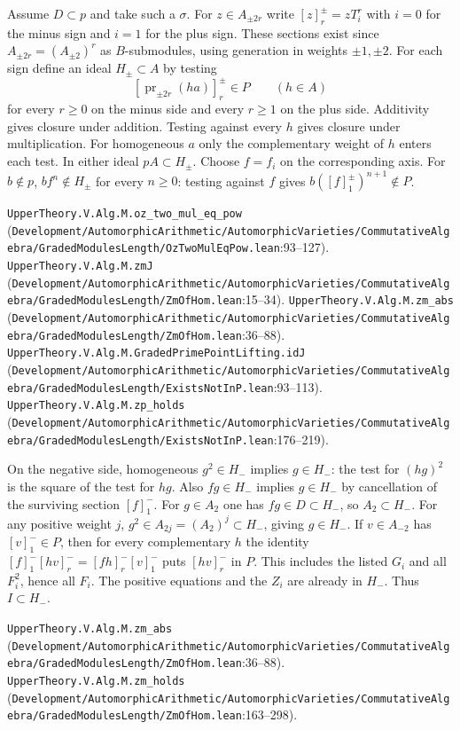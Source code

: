 Assume $D\subset p$ and take such a $\sigma$. For $z\in A_{\pm 2r}$ write
$[z]^\pm_r=zT_{i}^{r}$ with $i=0$ for the minus sign and $i=1$ for the plus sign.
These sections exist since $A_{\pm2r}=(A_{\pm2})^r$ as $B$-submodules,
using generation in weights $\pm1,\pm2$. For each sign define an ideal
$H_\pm\subset A$ by testing
\[
  [\operatorname{pr}_{\pm2r}(ha)]^\pm_r\in P\qquad(h\in A)
\]
for every $r\ge0$ on the minus side and every $r\ge1$ on the plus side.
Additivity gives closure under addition. Testing against every $h$ gives closure under
multiplication. For homogeneous $a$ only the complementary weight of $h$
enters each test. In either ideal $pA\subset H_\pm$. Choose $f=f_i$ on the
corresponding axis. For $b\notin p$, $bf^n\notin H_\pm$ for every $n\ge0$:
testing against $f$ gives $b([f]^\pm_1)^{n+1}\notin P$.
\par{\footnotesize \nolinkurl{UpperTheory.V.Alg.M.oz_two_mul_eq_pow} (\nolinkurl{Development/AutomorphicArithmetic/AutomorphicVarieties/CommutativeAlgebra/GradedModulesLength/OzTwoMulEqPow.lean}\allowbreak:93--127). \nolinkurl{UpperTheory.V.Alg.M.zmJ} (\nolinkurl{Development/AutomorphicArithmetic/AutomorphicVarieties/CommutativeAlgebra/GradedModulesLength/ZmOfHom.lean}\allowbreak:15--34). \nolinkurl{UpperTheory.V.Alg.M.zm_abs} (\nolinkurl{Development/AutomorphicArithmetic/AutomorphicVarieties/CommutativeAlgebra/GradedModulesLength/ZmOfHom.lean}\allowbreak:36--88). \nolinkurl{UpperTheory.V.Alg.M.GradedPrimePointLifting.idJ} (\nolinkurl{Development/AutomorphicArithmetic/AutomorphicVarieties/CommutativeAlgebra/GradedModulesLength/ExistsNotInP.lean}\allowbreak:93--113). \nolinkurl{UpperTheory.V.Alg.M.zp_holds} (\nolinkurl{Development/AutomorphicArithmetic/AutomorphicVarieties/CommutativeAlgebra/GradedModulesLength/ExistsNotInP.lean}\allowbreak:176--219).\par}

On the negative side, homogeneous $g^2\in H_-$ implies $g\in H_-$:
the test for $(h g)^2$ is the square of the test for $h g$. Also $fg\in H_-$
implies $g\in H_-$ by cancellation of the surviving section $[f]^-_1$.
For $g\in A_2$ one has $fg\in D\subset H_-$, so $A_2\subset H_-$.
For any positive weight $j$, $g^2\in A_{2j}=(A_2)^j\subset H_-$,
giving $g\in H_-$. If $v\in A_{-2}$ has $[v]^-_1\in P$, then for every
complementary $h$ the identity
$[f]^-_1[hv]^-_r=[fh]^-_r[v]^-_1$ puts $[hv]^-_r$ in $P$.
This includes the listed $G_i$ and all $F_i^2$, hence all $F_i$.
The positive equations and the $Z_i$ are already in $H_-$. Thus $I\subset H_-$.
\par{\footnotesize \nolinkurl{UpperTheory.V.Alg.M.zm_abs} (\nolinkurl{Development/AutomorphicArithmetic/AutomorphicVarieties/CommutativeAlgebra/GradedModulesLength/ZmOfHom.lean}\allowbreak:36--88). \nolinkurl{UpperTheory.V.Alg.M.zm_holds} (\nolinkurl{Development/AutomorphicArithmetic/AutomorphicVarieties/CommutativeAlgebra/GradedModulesLength/ZmOfHom.lean}\allowbreak:163--298).\par}


